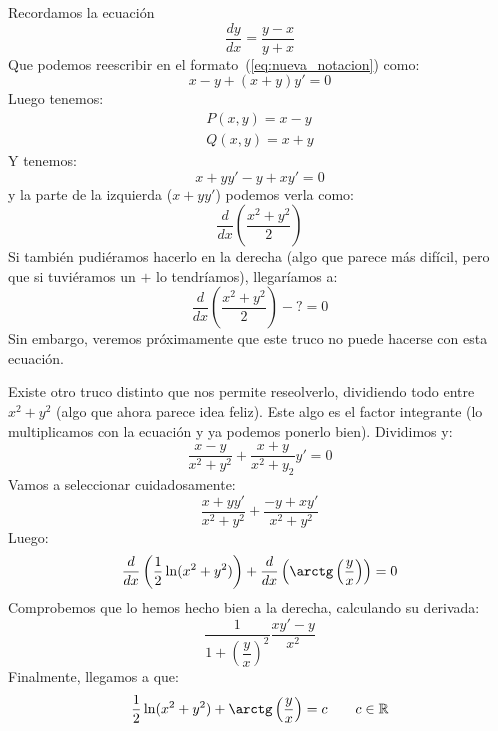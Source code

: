 \begin{ejemplo}
    Recordamos la ecuación
    \begin{equation*}
        \dfrac{dy}{dx} = \dfrac{y-x}{y+x}
    \end{equation*}
    Que podemos reescribir en el formato~(\ref{eq:nueva_notacion}) como:
    \begin{equation*}
        x-y+(x+y)y' = 0
    \end{equation*}
    Luego tenemos:
    \begin{gather*}
        P(x,y) = x-y \\
        Q(x,y) = x+y
    \end{gather*}
    Y tenemos:
    \begin{equation*}
        x+yy' - y+xy' = 0
    \end{equation*}
    y la parte de la izquierda ($x+yy'$) podemos verla como:
    \begin{equation*}
        \dfrac{d}{dx}\left(\dfrac{x^2+y^2}{2}\right)
    \end{equation*}
    Si también pudiéramos hacerlo en la derecha (algo que parece más difícil, pero que si tuviéramos un $+$ lo tendríamos), llegaríamos a:
    \begin{equation*}
        \dfrac{d}{dx}\left(\dfrac{x^2+y^2}{2}\right) - \text{?} = 0
    \end{equation*}
    Sin embargo, veremos próximamente que este truco no puede hacerse con esta ecuación.

    Existe otro truco distinto que nos permite reseolverlo, dividiendo todo entre $x^2 + y^2$ (algo que ahora parece idea feliz). Este algo es el factor integrante (lo multiplicamos con la ecuación y ya podemos ponerlo bien). Dividimos y:
    \begin{equation*}
        \dfrac{x-y}{x^2+y^2} + \dfrac{x+y}{x^2+y_2}y' = 0
    \end{equation*}
    Vamos a seleccionar cuidadosamente:
    \begin{equation*}
        \dfrac{x+yy'}{x^2+y^2} + \dfrac{-y+xy'}{x^2+y^2}
    \end{equation*}
    Luego:
    \begin{equation*}
        \dfrac{d}{dx}\left(\dfrac{1}{2}\ln(x^2+y^2)\right) + \dfrac{d}{dx}\left(\arctg\left(\dfrac{y}{x}\right)\right) = 0
    \end{equation*}
    Comprobemos que lo hemos hecho bien a la derecha, calculando su derivada:
    \begin{equation*}
        \dfrac{1}{1+{\left(\dfrac{y}{x}\right)}^{2}} \dfrac{xy'-y}{x^2}
    \end{equation*}
    Finalmente, llegamos a que:
    \begin{equation*}
        \dfrac{1}{2}\ln(x^2+y^2) + \arctg\left(\dfrac{y}{x}\right) = c \qquad c\in \mathbb{R}
    \end{equation*}
\end{ejemplo}

